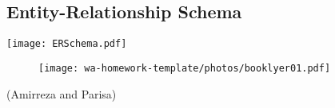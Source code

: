\subsection{Entity-Relationship Schema}

\texttt{[image: ERSchema.pdf]}
\begin{figure}[!h]
\centering
    \texttt{[image: wa-homework-template/photos/booklyer01.pdf]}
    \label{fig:erd}
\end{figure}


(Amirreza and Parisa)
